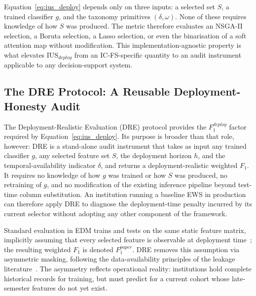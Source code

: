 \documentclass[a4paper,fleqn]{cas-sc}
\begin{document}
Equation~\eqref{eq:ius_deploy} depends only on three inputs: a selected set $S$, a trained classifier $g$, and the taxonomy primitives $(\delta, \omega)$. None of these requires knowledge of how $S$ was produced. The metric therefore evaluates an NSGA-II selection, a Boruta selection, a Lasso selection, or even the binarisation of a soft attention map without modification. This implementation-agnostic property is what elevates $\mathrm{IUS}_{deploy}$ from an IC-FS-specific quantity to an audit instrument applicable to any decision-support system.


\subsection{The DRE Protocol: A Reusable Deployment-Honesty Audit}
\label{sec:icfs:dre}
\label{sec:icfs:metrics:dre}

The Deployment-Realistic Evaluation (DRE) protocol provides the $F_1^{deploy}$ factor required by Equation~\eqref{eq:ius_deploy}. Its purpose is broader than that role, however: DRE is a stand-alone audit instrument that takes as input any trained classifier $g$, any selected feature set $S$, the deployment horizon $h$, and the temporal-availability indicator $\delta$, and returns a deployment-realistic weighted $F_1$. It requires no knowledge of how $g$ was trained or how $S$ was produced, no retraining of $g$, and no modification of the existing inference pipeline beyond test-time column substitution. An institution running a baseline EWS in production can therefore apply DRE to diagnose the deployment-time penalty incurred by its current selector without adopting any other component of the framework.

Standard evaluation in EDM trains and tests on the same static feature matrix, implicitly assuming that every selected feature is observable at deployment time~\citep{romero2020,viberg2018}; the resulting weighted $F_1$ is denoted $F_1^{paper}$. DRE removes this assumption via asymmetric masking, following the data-availability principles of the leakage literature~\citep{kaufman2012,kapoor2023,apicella2025}. The asymmetry reflects operational reality: institutions hold complete historical records for training, but must predict for a current cohort whose late-semester features do not yet exist.
\end{document}
